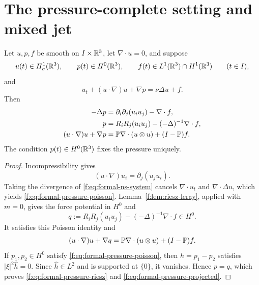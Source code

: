 \section{The pressure-complete setting and mixed jet}
\label{f:sec:formal-setting-mixed-jet}

\begin{proposition}
\label{f:prop:formal-pressure-normalization}
Let \(u,p,f\) be smooth on \(I\times\mathbb R^3\), let \(\nabla\cdot u=0\), and suppose
\[
 u(t)\in H^1_\sigma(\mathbb R^3),
 \qquad
 p(t)\in H^0(\mathbb R^3),
 \qquad f(t)\in L^1(\mathbb R^3)\cap H^1(\mathbb R^3)
 \qquad(t\in I),
\]
and
\begin{equation}
 u_t+(u\cdot\nabla)u+\nabla p=\nu\Delta u+f.
 \label{f:eq:formal-ns-system}
\end{equation}
Then
\begin{align}
 -\Delta p
 &=\partial_i\partial_j(u_i u_j)-\nabla\cdot f,
 \label{f:eq:formal-pressure-poisson}\\
 p
 &=R_iR_j(u_i u_j)-(-\Delta)^{-1}\nabla\cdot f,
 \label{f:eq:formal-pressure-riesz}\\
 (u\cdot\nabla)u+\nabla p
 &=\mathbb P\nabla\cdot(u\otimes u)+(I-\mathbb P)f.
 \label{f:eq:formal-pressure-projected}
\end{align}
The condition \(p(t)\in H^0(\mathbb R^3)\) fixes the pressure uniquely.
\end{proposition}

\begin{proof}
Incompressibility gives
\[
 (u\cdot\nabla)u_i=\partial_j(u_j u_i).
\]
Taking the divergence of \eqref{f:eq:formal-ns-system} cancels
\(\nabla\cdot u_t\) and \(\nabla\cdot\Delta u\), which yields
\eqref{f:eq:formal-pressure-poisson}.  Lemma~\ref{f:lem:riesz-leray}, applied
with \(m=0\), gives the force potential in \(H^0\) and
\[
 q:=R_iR_j(u_i u_j)-(-\Delta)^{-1}\nabla\cdot f\in H^0.
\]
It satisfies this Poisson identity and
\[
 (u\cdot\nabla)u+\nabla q
 =\mathbb P\nabla\cdot(u\otimes u)+(I-\mathbb P)f.
\]
If \(p_1,p_2\in H^0\) satisfy \eqref{f:eq:formal-pressure-poisson}, then
\(h=p_1-p_2\) satisfies
\(|\xi|^2\widehat h=0\).  Since \(\widehat h\in L^2\) and is supported at
\(\{0\}\), it vanishes.  Hence \(p=q\), which proves
\eqref{f:eq:formal-pressure-riesz} and \eqref{f:eq:formal-pressure-projected}.
\end{proof}


